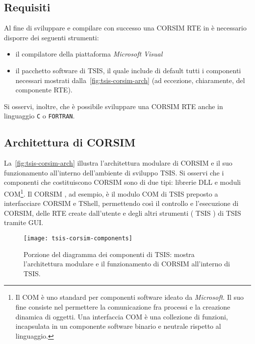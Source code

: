 \subsection{Requisiti}
Al fine di sviluppare e compilare con successo una \acs{CORSIM} \acs{RTE} in \CC{} è necessario disporre dei seguenti strumenti:
\begin{itemize}
    \item il compilatore della piattaforma \emph{Microsoft Visual \CC{}}
    \item il pacchetto software di \acs{TSIS}, il quale include di default tutti i componenti necessari mostrati dalla~\vref{fig:tsis-corsim-arch} (ad eccezione, chiaramente, del componente \acs{RTE}).
\end{itemize}
Si osservi, inoltre, che è possibile sviluppare una \acs{CORSIM} \acs{RTE} anche in linguaggio \lstinline[]|C| o \lstinline[]|FORTRAN|.

\subsection{Architettura di CORSIM}

La~\vref{fig:tsis-corsim-arch} illustra l'architettura modulare di \acs{CORSIM} e il suo funzionamento all'interno dell'ambiente di sviluppo \acs{TSIS}. Si osservi che i componenti che costituiscono \acs{CORSIM} sono di due tipi: librerie \acs{DLL} e moduli \acs{COM}\footnote{Il \acf{COM} è uno standard per componenti software ideato da \emph{Microsoft}. Il suo fine consiste nel permettere la comunicazione fra processi e la creazione dinamica di oggetti. Una interfaccia \acs{COM} è una collezione di funzioni, incapsulata in un componente software binario e neutrale rispetto al linguaggio.}. Il \acs{CORSIM} , ad esempio, è il modulo \acs{COM} di \acs{TSIS} preposto a interfacciare \acs{CORSIM} e \acs{TShell}, permettendo così il controllo e l'esecuzione di \acs{CORSIM}, delle \acs{RTE} create dall'utente e degli altri strumenti (\eg{} \acs{TSIS} ) di \acs{TSIS} tramite \acs{GUI}.

\begin{sidewaysfigure}
\centering
\texttt{[image: tsis-corsim-components]}
\caption[Diagramma dei componenti di \acs{CORSIM}]{Porzione del diagramma dei componenti di \acs{TSIS}: mostra l'architettura modulare e il funzionamento di \acs{CORSIM} all'interno di \acs{TSIS}.}
\label{fig:tsis-corsim-arch}
\end{sidewaysfigure}

